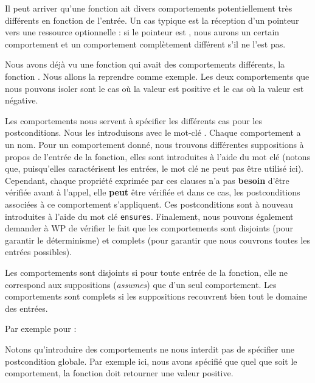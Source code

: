 Il peut arriver qu'une fonction ait divers comportements potentiellement très
différents en fonction de l'entrée. Un cas typique est la réception d'un
pointeur vers une ressource optionnelle : si le pointeur est , nous
aurons un certain comportement et un comportement complètement différent s'il ne
l'est pas.



Nous avons déjà vu une fonction qui avait des comportements différents, la
fonction . Nous allons la reprendre comme exemple. Les deux
comportements que nous pouvons isoler sont le cas où la valeur est positive et
le cas où la valeur est négative.



Les comportements nous servent à spécifier les différents cas pour les
postconditions. Nous les introduisons avec le mot-clé .
Chaque comportement a un nom. Pour un comportement donné, nous trouvons
différentes suppositions à propos de l'entrée de la fonction, elles sont
introduites à l'aide du mot clé  (notons que, puisqu'elles
caractérisent les entrées, le mot clé  ne peut
pas être utilisé ici). Cependant, chaque propriété exprimée par ces clauses
n'a pas \textbf{besoin} d'être vérifiée avant à l'appel, elle \textbf{peut}
être vérifiée et dans ce cas, les postconditions associées à ce comportement
s'appliquent. Ces postconditions sont à nouveau introduites à l'aide du mot
clé \texttt{ensures}. Finalement, nous pouvons également demander à WP
de vérifier le fait que les comportements sont disjoints (pour garantir
le déterminisme) et complets (pour garantir que nous couvrons toutes les
entrées possibles).



Les comportements sont disjoints si pour toute entrée de la fonction, elle ne
correspond aux suppositions (\textit{assumes}) que d'un seul comportement. Les
comportements sont complets si les suppositions recouvrent bien tout le domaine
des entrées.



Par exemple pour  :





Notons qu'introduire des comportements ne nous interdit pas de spécifier une
postcondition globale. Par exemple ici, nous avons spécifié que quel que soit
le comportement, la fonction doit retourner une valeur positive.


